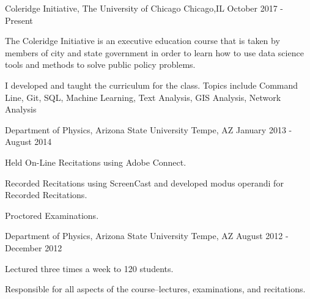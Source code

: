 

\begin{cventries}


    {Coleridge Initiative, The University of Chicago} %
    {Chicago,IL} %
    {October 2017 - Present} %
    {\begin{cvitems}\item {The Coleridge Initiative is an executive education course that is taken by members of city and state government in order to learn how to use data science tools and methods to solve public policy problems.}\item {I developed and taught the curriculum for the class. Topics include Command Line, Git, SQL, Machine Learning, Text Analysis, GIS Analysis, Network Analysis}\end{cvitems}}


    {Department of Physics, Arizona State University} %
    {Tempe, AZ} %
    {January 2013 - August 2014} %
    {
      \begin{cvitems} %
        \item {Held On-Line Recitations using Adobe Connect.}
        \item {Recorded Recitations using ScreenCast and developed modus operandi for Recorded Recitations.}
        \item {Proctored Examinations.}
      \end{cvitems}
    }

    {Department of Physics, Arizona State University} %
    {Tempe, AZ} %
    {August 2012 - December 2012} %
    {
      \begin{cvitems} %
        \item {Lectured three times a week to 120 students.}
        \item {Responsible for all aspects of the course--lectures, examinations, and recitations.}
      \end{cvitems}
    }


\end{cventries}
